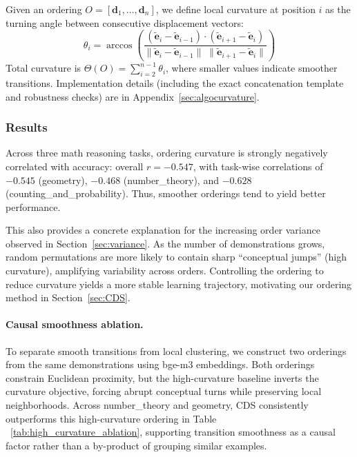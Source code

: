 \documentclass{llmxive}
\begin{document}
Given an ordering $O=[\mathbf{d}_1,\dots,\mathbf{d}_n]$, we define local curvature at position $i$ as the turning angle between consecutive displacement vectors:
\begin{equation}
\theta_i
=
\arccos\left(
\frac{(\tilde{\mathbf{e}}_{i} - \tilde{\mathbf{e}}_{i-1}) \cdot (\tilde{\mathbf{e}}_{i+1} - \tilde{\mathbf{e}}_{i})}
{\|\tilde{\mathbf{e}}_{i} - \tilde{\mathbf{e}}_{i-1}\|\;\|\tilde{\mathbf{e}}_{i+1} - \tilde{\mathbf{e}}_{i}\|}
\right)
\end{equation}
Total curvature is $\Theta(O)=\sum_{i=2}^{n-1}\theta_i$, where smaller values indicate smoother transitions.
Implementation details (including the exact concatenation template and robustness checks) are in Appendix~\ref{sec:algocurvature}.

\subsubsection{Results}
Across three math reasoning tasks, ordering curvature is strongly negatively correlated with accuracy: overall $r=-0.547$, with task-wise correlations of $-0.545$ (geometry), $-0.468$ (number\_theory), and $-0.628$ (counting\_and\_probability).
Thus, smoother orderings tend to yield better performance.

This also provides a concrete explanation for the increasing order variance observed in Section~\ref{sec:variance}.
As the number of demonstrations grows, random permutations are more likely to contain sharp ``conceptual jumps'' (high curvature), amplifying variability across orders.
Controlling the ordering to reduce curvature yields a more stable learning trajectory, motivating our ordering method in Section~\ref{sec:CDS}.

\paragraph{Causal smoothness ablation.}
To separate smooth transitions from local clustering, we construct two orderings from the same demonstrations using bge-m3 embeddings.
Both orderings constrain Euclidean proximity, but the high-curvature baseline inverts the curvature objective, forcing abrupt conceptual turns while preserving local neighborhoods.
Across number\_theory and geometry, CDS consistently outperforms this high-curvature ordering in Table ~\ref{tab:high_curvature_ablation}, supporting transition smoothness as a causal factor rather than a by-product of grouping similar examples.
\end{document}
